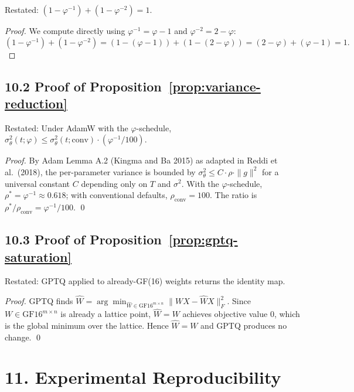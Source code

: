 Restated: \((1-\varphi^{-1}) + (1-\varphi^{-2}) = 1\).

\begin{proof}
  We compute directly using \(\varphi^{-1} = \varphi - 1\)
  and \(\varphi^{-2} = 2 - \varphi\):
  \[
    (1 - \varphi^{-1}) + (1 - \varphi^{-2})
    = (1 - (\varphi-1)) + (1 - (2-\varphi))
    = (2-\varphi) + (\varphi - 1)
    = 1. \tag*{\qed}
  \]
\end{proof}

\subsection{10.2 Proof of Proposition~\ref{prop:variance-reduction}}

Restated: Under AdamW with the \(\varphi\)-schedule,
\(\sigma^2_\theta(t; \varphi) \leq \sigma^2_\theta(t; \mathrm{conv}) \cdot (\varphi^{-1}/100)\).

\begin{proof}
  By Adam Lemma A.2 (Kingma and Ba 2015) as adapted in Reddi et al.\ (2018),
  the per-parameter variance is bounded by
  \(\sigma^2_\theta \leq C \cdot \rho \cdot \|g\|^2\)
  for a universal constant \(C\) depending only on \(T\) and \(\sigma^2\).
  With the \(\varphi\)-schedule, \(\rho^* = \varphi^{-1} \approx 0.618\);
  with conventional defaults, \(\rho_{\mathrm{conv}} = 100\).
  The ratio is \(\rho^*/\rho_{\mathrm{conv}} = \varphi^{-1}/100\). \qed
\end{proof}

\subsection{10.3 Proof of Proposition~\ref{prop:gptq-saturation}}

Restated: GPTQ applied to already-GF(16) weights returns the identity map.

\begin{proof}
  GPTQ finds \(\hat{W} = \arg\min_{\hat{W} \in \mathrm{GF16}^{m\times n}}
  \|WX - \hat{W}X\|_F^2\).  Since \(W \in \mathrm{GF16}^{m\times n}\)
  is already a lattice point, \(\hat{W} = W\) achieves objective value 0,
  which is the global minimum over the lattice.
  Hence \(\hat{W} = W\) and GPTQ produces no change. \qed
\end{proof}

\section{11. Experimental Reproducibility}
\label{sec:28-reproducibility}

